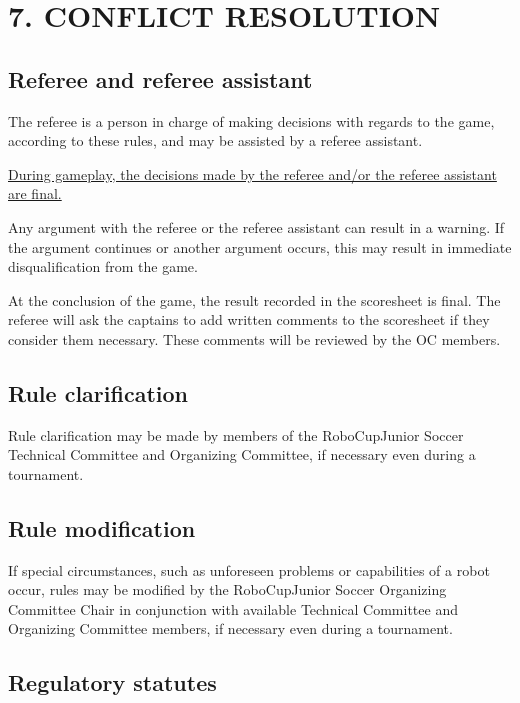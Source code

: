 \documentclass{article}
\begin{document}
\section{7. CONFLICT RESOLUTION \label{ref-047}}

\subsection{ Referee and referee assistant \label{ref-048}}

The referee is a person in charge of making decisions with regards to the game, according to these rules, and may be assisted by a referee assistant.

 \underline{During gameplay, the decisions made by the referee and/or the referee assistant are final.}

Any argument with the referee or the referee assistant can result in a warning. If the argument continues or another argument occurs, this may result in immediate disqualification from the game.

At the conclusion of the game, the result recorded in the scoresheet is final. The referee will ask the captains to add written comments to the scoresheet if they consider them necessary. These comments will be reviewed by the OC members.

\subsection{ Rule clarification \label{ref-049}}

Rule clarification may be made by members of the RoboCupJunior Soccer Technical Committee and Organizing Committee, if necessary even during a tournament.

\subsection{ Rule modification \label{ref-050}}

If special circumstances, such as unforeseen problems or capabilities of a robot occur, rules may be modified by the RoboCupJunior Soccer Organizing Committee Chair in conjunction with available Technical Committee and Organizing Committee members, if necessary even during a tournament.

\subsection{ Regulatory statutes \label{ref-051}}
\end{document}
